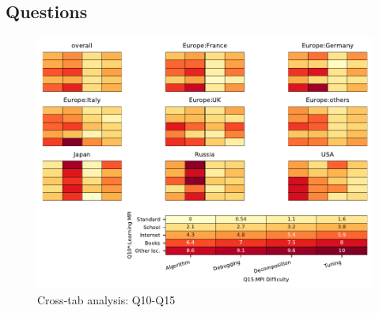 
\subsection{Questions}


\begin{figure}
\begin{center}
\includegraphics[width=12cm]{../pdfs/Q10-Q15.pdf}
\caption{Cross-tab analysis: Q10-Q15}
\label{fig:Q10-Q15}
\end{center}
\end{figure}
